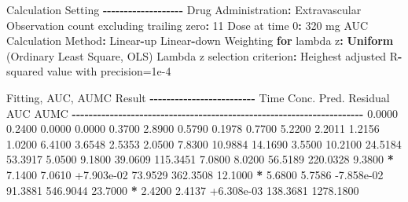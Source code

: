 \documentclass[
  12pt,
]{krantz}
\newenvironment{Shaded}{\begin{snugshade}}{\end{snugshade}}
\newcommand{\ControlFlowTok}[1]{\textcolor[rgb]{0.13,0.29,0.53}{\textbf{#1}}}
\newcommand{\DecValTok}[1]{\textcolor[rgb]{0.00,0.00,0.81}{#1}}
\newcommand{\FloatTok}[1]{\textcolor[rgb]{0.00,0.00,0.81}{#1}}
\newcommand{\KeywordTok}[1]{\textcolor[rgb]{0.13,0.29,0.53}{\textbf{#1}}}
\newcommand{\NormalTok}[1]{#1}
\newcommand{\OperatorTok}[1]{\textcolor[rgb]{0.81,0.36,0.00}{\textbf{#1}}}
\newcommand{\StringTok}[1]{\textcolor[rgb]{0.31,0.60,0.02}{#1}}
\begin{document}
\begin{Shaded}
\begin{Highlighting}[]
\NormalTok{Calculation Setting}
\OperatorTok{{-}{-}{-}{-}{-}{-}{-}{-}{-}{-}{-}{-}{-}{-}{-}{-}{-}{-}{-}}
\NormalTok{Drug Administration}\OperatorTok{:}\StringTok{ }\NormalTok{Extravascular}
\NormalTok{Observation count excluding trailing zero}\OperatorTok{:}\StringTok{ }\DecValTok{11}
\NormalTok{Dose at time }\DecValTok{0}\OperatorTok{:}\StringTok{ }\DecValTok{320}\NormalTok{ mg}
\NormalTok{AUC Calculation Method}\OperatorTok{:}\StringTok{ }\NormalTok{Linear}\OperatorTok{{-}}\NormalTok{up Linear}\OperatorTok{{-}}\NormalTok{down}
\NormalTok{Weighting }\ControlFlowTok{for}\NormalTok{ lambda z}\OperatorTok{:}\StringTok{ }\KeywordTok{Uniform}\NormalTok{ (Ordinary Least Square, OLS)}
\NormalTok{Lambda z selection criterion}\OperatorTok{:}\StringTok{ }\NormalTok{Heighest adjusted R}\OperatorTok{{-}}\NormalTok{squared value with precision=}\FloatTok{1e{-}4}


\NormalTok{Fitting, AUC, AUMC Result}
\OperatorTok{{-}{-}{-}{-}{-}{-}{-}{-}{-}{-}{-}{-}{-}{-}{-}{-}{-}{-}{-}{-}{-}{-}{-}{-}{-}}
\StringTok{      }\NormalTok{Time         Conc.      Pred.   Residual       AUC       AUMC}
\OperatorTok{{-}{-}{-}{-}{-}{-}{-}{-}{-}{-}{-}{-}{-}{-}{-}{-}{-}{-}{-}{-}{-}{-}{-}{-}{-}{-}{-}{-}{-}{-}{-}{-}{-}{-}{-}{-}{-}{-}{-}{-}{-}{-}{-}{-}{-}{-}{-}{-}{-}{-}{-}{-}{-}{-}{-}{-}{-}{-}{-}{-}{-}{-}{-}{-}{-}{-}{-}{-}{-}}
\StringTok{     }\FloatTok{0.0000}       \FloatTok{0.2400}                           \FloatTok{0.0000}     \FloatTok{0.0000}
     \FloatTok{0.3700}       \FloatTok{2.8900}                           \FloatTok{0.5790}     \FloatTok{0.1978}
     \FloatTok{0.7700}       \FloatTok{5.2200}                           \FloatTok{2.2011}     \FloatTok{1.2156}
     \FloatTok{1.0200}       \FloatTok{6.4100}                           \FloatTok{3.6548}     \FloatTok{2.5353}
     \FloatTok{2.0500}       \FloatTok{7.8300}                          \FloatTok{10.9884}    \FloatTok{14.1690}
     \FloatTok{3.5500}      \FloatTok{10.2100}                          \FloatTok{24.5184}    \FloatTok{53.3917}
     \FloatTok{5.0500}       \FloatTok{9.1800}                          \FloatTok{39.0609}   \FloatTok{115.3451}
     \FloatTok{7.0800}       \FloatTok{8.0200}                          \FloatTok{56.5189}   \FloatTok{220.0328}
     \FloatTok{9.3800} \OperatorTok{*}\StringTok{     }\FloatTok{7.1400}     \FloatTok{7.0610} \FloatTok{+7.903e{-}02}    \FloatTok{73.9529}   \FloatTok{362.3508}
    \FloatTok{12.1000} \OperatorTok{*}\StringTok{     }\FloatTok{5.6800}     \FloatTok{5.7586} \FloatTok{{-}7.858e{-}02}    \FloatTok{91.3881}   \FloatTok{546.9044}
    \FloatTok{23.7000} \OperatorTok{*}\StringTok{     }\FloatTok{2.4200}     \FloatTok{2.4137} \FloatTok{+6.308e{-}03}   \FloatTok{138.3681}  \FloatTok{1278.1800}


\end{Highlighting}
\end{Shaded}
\end{document}
